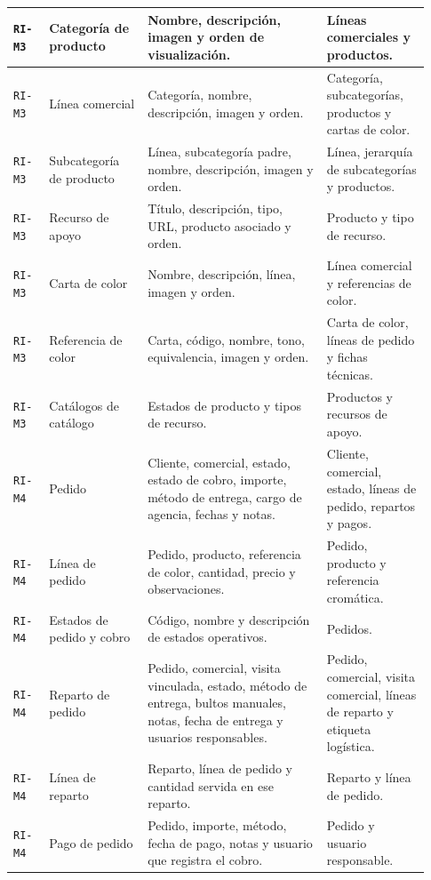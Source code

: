 {\begin{supertabular}{|>{\raggedright\arraybackslash}p{0.08\linewidth}|>{\raggedright\arraybackslash}p{0.22\linewidth}|>{\raggedright\arraybackslash}p{0.40\linewidth}|>{\raggedright\arraybackslash}p{0.23\linewidth}|}
\texttt{RI-M3} & Categoría de producto & Nombre, descripción, imagen y orden de visualización. & Líneas comerciales y productos. \\
\hline
\texttt{RI-M3} & Línea comercial & Categoría, nombre, descripción, imagen y orden. & Categoría, subcategorías, productos y cartas de color. \\
\hline
\texttt{RI-M3} & Subcategoría de producto & Línea, subcategoría padre, nombre, descripción, imagen y orden. & Línea, jerarquía de subcategorías y productos. \\
\hline
\texttt{RI-M3} & Recurso de apoyo & Título, descripción, tipo, URL, producto asociado y orden. & Producto y tipo de recurso. \\
\hline
\texttt{RI-M3} & Carta de color & Nombre, descripción, línea, imagen y orden. & Línea comercial y referencias de color. \\
\hline
\texttt{RI-M3} & Referencia de color & Carta, código, nombre, tono, equivalencia, imagen y orden. & Carta de color, líneas de pedido y fichas técnicas. \\
\hline
\texttt{RI-M3} & Catálogos de catálogo & Estados de producto y tipos de recurso. & Productos y recursos de apoyo. \\
\hline
{}
\texttt{RI-M4} & Pedido & Cliente, comercial, estado, estado de cobro, importe, método de entrega, cargo de agencia, fechas y notas. & Cliente, comercial, estado, líneas de pedido, repartos y pagos. \\
\hline
\texttt{RI-M4} & Línea de pedido & Pedido, producto, referencia de color, cantidad, precio y observaciones. & Pedido, producto y referencia cromática. \\
\hline
\texttt{RI-M4} & Estados de pedido y cobro & Código, nombre y descripción de estados operativos. & Pedidos. \\
\hline
\texttt{RI-M4} & Reparto de pedido & Pedido, comercial, visita vinculada, estado, método de entrega, bultos manuales, notas, fecha de entrega y usuarios responsables. & Pedido, comercial, visita comercial, líneas de reparto y etiqueta logística. \\
\hline
\texttt{RI-M4} & Línea de reparto & Reparto, línea de pedido y cantidad servida en ese reparto. & Reparto y línea de pedido. \\
\hline
\texttt{RI-M4} & Pago de pedido & Pedido, importe, método, fecha de pago, notas y usuario que registra el cobro. & Pedido y usuario responsable. \\

\end{supertabular}}

